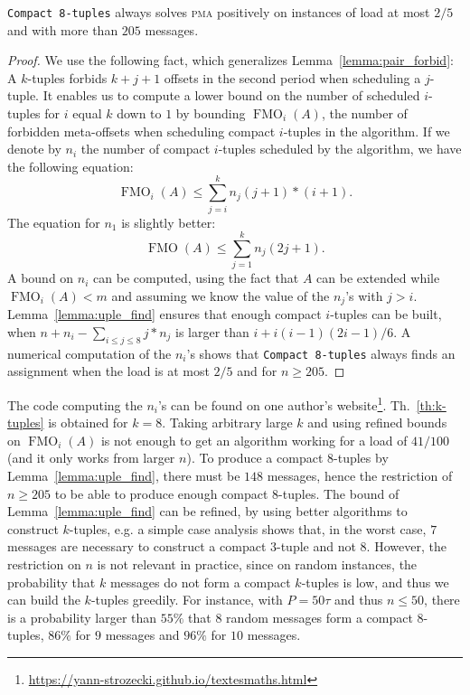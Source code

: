 \documentclass[a4paper,UKenglish,cleveref, autoref, thm-restate]{lipics-v2019}
\DeclareMathOperator{\Fmo}{FMO}
\newcommand\pma{\textsc{pma}\xspace}
\begin{document}
\begin{theorem}\label{th:k-tuples}
\texttt{Compact 8-tuples} always solves \pma positively on instances of load at most $2/5$and with more than $205$ messages.
\end{theorem}
\begin{proof}
We use the following fact, which generalizes Lemma~\ref{lemma:pair_forbid}: A $k$-tuples forbids $k+j+1$ offsets in the second period when scheduling a $j$-tuple. 
It enables us to compute a lower bound on the number of scheduled $i$-tuples for $i$ equal $k$ down to $1$ by bounding $\Fmo_i(A)$, the number of forbidden meta-offsets when scheduling compact $i$-tuples in the algorithm. 
If we denote by $n_i$ the number of compact $i$-tuples scheduled by the algorithm,
we have the following equation:  $$ \Fmo_i(A) \leq \displaystyle{\sum_{j=i}^k n_j(j+1)*(i+1)}.$$
The equation for $n_1$ is slightly better: 
$$ \Fmo(A) \leq \displaystyle{\sum_{j=1}^k n_j(2j + 1)}.$$
A bound on $n_i$ can be computed, using the fact that $A$ can be extended while $\Fmo_i(A) < m$ and assuming we know the value of the $n_j$'s with $j > i$. 
Lemma~\ref{lemma:uple_find} ensures that enough compact $i$-tuples can be built, when $n + n_i - \sum_{i \leq j \leq 8} j*n_j$ is larger than $i + i(i-1)(2i-1)/6$. 
A numerical computation of the $n_i$'s shows that \texttt{Compact 8-tuples} always finds an assignment when the load is at most $2/5$ and for $n \geq 205$.
\end{proof}

The code computing the $n_i$'s can be found on one author's website\footnote{\url{https://yann-strozecki.github.io/textesmaths.html}}. Th.~\ref{th:k-tuples} is obtained for $k=8$. Taking arbitrary large $k$ and using refined bounds on $\Fmo_i(A)$ is not enough to get an algorithm working for a load of $41/100$ (and it only works from larger $n$). To produce a compact $8$-tuples by Lemma~\ref{lemma:uple_find}, there must be $148$ messages, hence the restriction of $n \geq 205$ to be able to produce enough compact $8$-tuples.
The bound of Lemma~\ref{lemma:uple_find} can be refined, by using better algorithms to construct $k$-tuples, e.g. a simple case analysis shows that, in the worst case, $7$ messages are necessary to construct a compact $3$-tuple and not $8$. However, the restriction on $n$ is not relevant in practice, since on random instances, the probability that $k$ messages do not form a compact $k$-tuples is low, and thus we can build the $k$-tuples greedily. For instance, with $P=50\tau$ and thus $n \leq 50$, there is a probability larger than $55\%$ that $8$ random messages form a compact $8$-tuples, $86\%$ for $9$ messages and $96\%$ for $10$ messages.
\end{document}
